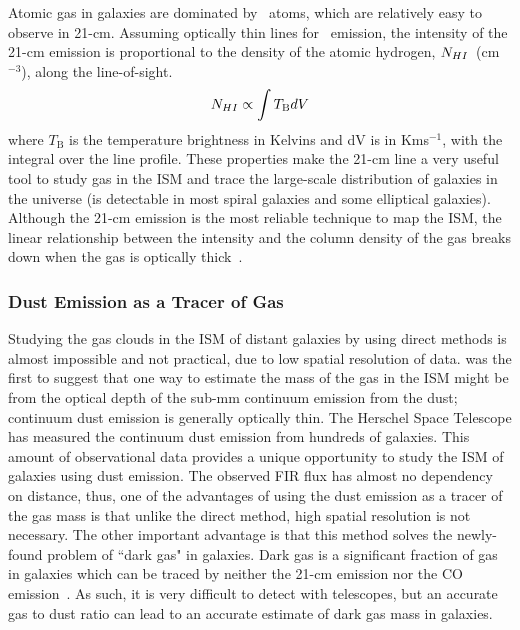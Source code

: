 
Atomic gas in galaxies are dominated by \hi~atoms, which are relatively easy to observe in 21-cm.
Assuming optically thin lines for \hi~emission, the intensity of the 21-cm emission is proportional to the density of the atomic hydrogen, $N_{H {\sc I}}$~(cm$^{-3}$), along the line-of-sight.
\begin{equation}
N_{H {\sc I}}  \propto \int T_{\mathrm B} dV
\end{equation}
where $T_{\mathrm B}$ is the temperature brightness in Kelvins and dV is in Kms$^{-1}$, with the integral over the line profile. 
These properties make the 21-cm line a very useful tool to study gas in the ISM and trace the large-scale distribution of galaxies in the universe (\hi is detectable in most spiral galaxies and some elliptical galaxies).
Although the 21-cm emission is the most reliable technique to map the ISM, the linear relationship between the intensity and the column density of the gas breaks down when the gas is optically thick~\citep{Braun09}. 

\subsubsection{Dust Emission as a Tracer of Gas} 

Studying the gas clouds in the ISM of distant galaxies by using direct methods is almost impossible and not practical, due to low spatial resolution of data.
\cite{Hildebran83} was the first to suggest that one way to estimate the mass of the gas in the ISM might be from the optical depth of the sub-mm continuum emission from the dust; continuum dust emission is generally optically thin. 
The Herschel Space Telescope \cite{Pilbratt10} has measured the continuum dust emission from hundreds of galaxies\citep{Eales10, Oliver12}. 
This amount of observational data provides a unique opportunity to study the ISM of galaxies using dust emission. 
The observed FIR flux has almost no dependency on distance, thus, one of the advantages of using the dust emission as a tracer of the gas mass is that unlike the direct method, high spatial resolution is not necessary. 
The other important advantage is that this method solves the newly-found problem of ``dark gas" in galaxies. 
Dark gas is a significant fraction of gas in galaxies which can be traced by neither the 21-cm emission nor the CO emission~\citep{Abdo10}. 
As such, it is very difficult to detect with telescopes, but an accurate gas to dust ratio can lead to an accurate estimate of dark gas mass in galaxies. 

